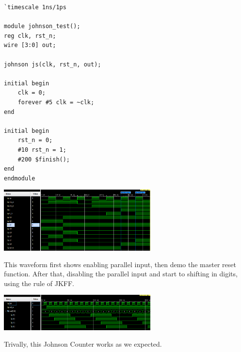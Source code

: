\documentclass[onecolumn, oneside, ctexart]{SUSTechHomework}
\begin{document}
\begin{lstlisting}[caption={Johnson Counter (Testbench)}]
`timescale 1ns/1ps

module johnson_test();
reg clk, rst_n;
wire [3:0] out;

johnson js(clk, rst_n, out);

initial begin
    clk = 0;
    forever #5 clk = ~clk;
end

initial begin
    rst_n = 0;
    #10 rst_n = 1;
    #200 $finish();
end
endmodule
\end{lstlisting}

\centerline{\includegraphics[width=0.6\textwidth]{fig/sr}}
\par This waveform first shows enabling parallel input, then demo the master reset function. After that, disabling the parallel input and start to shifting in digits, using the rule of JKFF.

\vspace{1.5em}
\centerline{\includegraphics[width=0.6\textwidth]{fig/js}}
\par Trivally, this Johnson Counter works as we expected.
\end{document}
